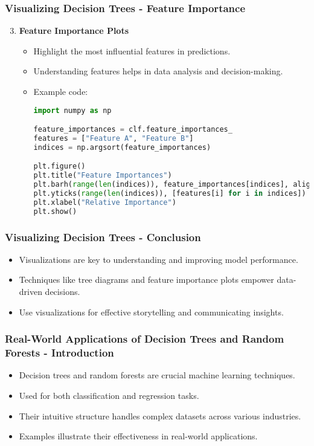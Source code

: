 \documentclass[aspectratio=169]{beamer}
\begin{document}
\begin{frame}[fragile]
    \frametitle{Visualizing Decision Trees - Feature Importance}
    \begin{enumerate}
        \setcounter{enumi}{2}
        \item \textbf{Feature Importance Plots}
            \begin{itemize}
                \item Highlight the most influential features in predictions.
                \item Understanding features helps in data analysis and decision-making.
                \item Example code:
                \begin{lstlisting}[language=Python]
import numpy as np

feature_importances = clf.feature_importances_
features = ["Feature A", "Feature B"]
indices = np.argsort(feature_importances)

plt.figure()
plt.title("Feature Importances")
plt.barh(range(len(indices)), feature_importances[indices], align="center")
plt.yticks(range(len(indices)), [features[i] for i in indices])
plt.xlabel("Relative Importance")
plt.show()
                \end{lstlisting}
            \end{itemize}
    \end{enumerate}
\end{frame}

\begin{frame}[fragile]
    \frametitle{Visualizing Decision Trees - Conclusion}
    \begin{itemize}
        \item Visualizations are key to understanding and improving model performance.
        \item Techniques like tree diagrams and feature importance plots empower data-driven decisions.
        \item Use visualizations for effective storytelling and communicating insights.
    \end{itemize}
\end{frame}

\begin{frame}[fragile]
    \frametitle{Real-World Applications of Decision Trees and Random Forests - Introduction}
    \begin{itemize}
        \item Decision trees and random forests are crucial machine learning techniques.
        \item Used for both classification and regression tasks.
        \item Their intuitive structure handles complex datasets across various industries.
        \item Examples illustrate their effectiveness in real-world applications.
    \end{itemize}
\end{frame}
\end{document}
